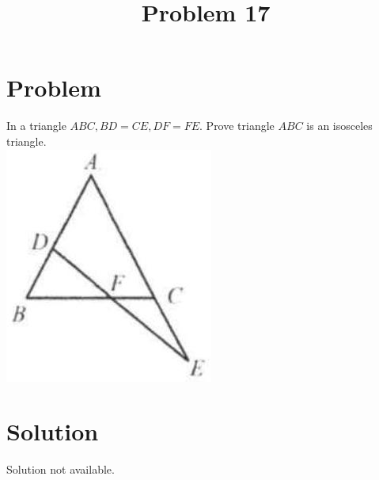 \documentclass{article}
\title{Problem 17}
\date{}
\begin{document}
\maketitle

\section*{Problem}
In a triangle \(A B C, B D=C E, D F=F E\). Prove triangle \(A B C\) is an isosceles triangle.\\
\centering
\includegraphics[width=\textwidth]{images/091(1).jpg}

\section*{Solution}
Solution not available.
\end{document}
